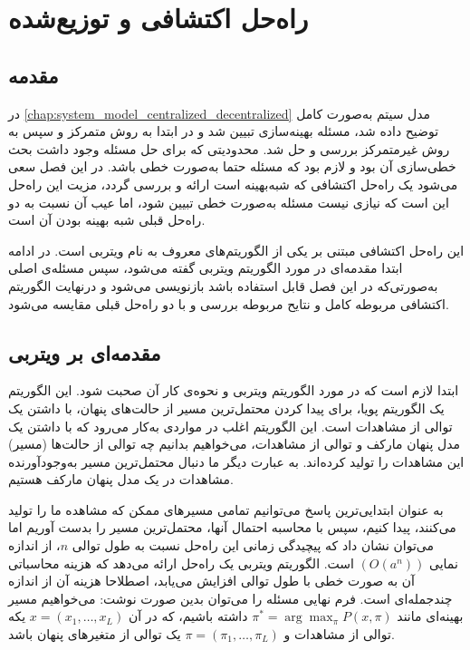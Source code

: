 \chapter{راه‌حل اکتشافی و توزیع‌شده}\label{chap:4-heuristic_distributed}
\thispagestyle{empty}
\section{مقدمه}
	در \cref{chap:system_model_centralized_decentralized} مدل سیتم به‌صورت کامل توضیح داده شد، مسئله بهینه‌سازی تبیین شد و در ابتدا به روش متمرکز و سپس به روش غیرمتمرکز بررسی و حل شد. محدودیتی که برای حل مسئله وجود داشت بحث خطی‌سازی آن بود و لازم بود که مسئله حتما به‌صورت خطی باشد.
	 در این فصل سعی می‌شود یک راه‌حل اکتشافی که شبه‌بهینه است ارائه و بررسی گردد، مزیت این راه‌حل این است که نیازی نیست مسئله به‌صورت خطی تبیین شود، اما عیب آن نسبت به دو راه‌حل قبلی شبه بهینه بودن آن است. 
	 
	 این راه‌حل اکتشافی مبتنی بر یکی از الگوریتم‌های معروف به نام ویتربی است. در ادامه ابتدا مقدمه‌ای در مورد الگوریتم ویتربی گفته می‌شود، سپس مسئله‌ی اصلی به‌صورتی‌که در این فصل قابل استفاده باشد بازنویسی می‌شود و درنهایت الگوریتم اکتشافی مربوطه کامل و نتایح مربوطه بررسی و با دو راه‌حل قبلی مقایسه می‌شود. 
\section{مقدمه‌ای بر ویتربی}
	 ابتدا لازم است که در مورد الگوریتم ویتربی و نحوه‌ی کار آن صحبت شود. این الگوریتم یک الگوریتم پویا، برای پیدا کردن محتمل‌ترین مسیر از حالت‌های پنهان، با داشتن یک توالی از مشاهدات است. این الگوریتم اغلب در مواردی به‌کار می‌رود که با داشتن یک مدل پنهان مارکف و توالی‌ از مشاهدات، می‌خواهیم بدانیم چه توالی‌ از حالت‌ها (مسیر) این مشاهدات را تولید کرده‌اند. به عبارت دیگر ما دنبال محتمل‌ترین مسیر به‌وجودآورنده مشاهدات در یک مدل پنهان مارکف هستیم. 
	 
	 به عنوان ابتدایی‌ترین پاسخ می‌توانیم تمامی مسیرهای ممکن که مشاهده ما را تولید می‌کنند، پیدا کنیم، سپس با محاسبه احتمال آنها، محتمل‌ترین مسیر را بدست آوریم اما می‌توان نشان داد که پیچیدگی زمانی این راه‌حل نسبت به طول توالی $n$، از اندازه نمایی $(O(a^n))$ است. الگوریتم ویتربی یک راه‌حل ارائه می‌دهد که هزینه محاسباتی آن به صورت خطی با طول توالی افزایش می‌یابد، اصطلاحا هزینه آن از اندازه چندجمله‌ای است. فرم نهایی مسئله را می‌توان بدین صورت نوشت: می‌خواهیم مسیر بهینه‌ای مانند $\displaystyle \pi^* = \arg \max_\pi P(x,\pi)$ داشته باشیم، که در آن $x=(x_1, \dots, x_L)$ یکه توالی از مشاهدات و $\pi = (\pi_1, \dots, \pi_L)$ یک توالی از متغیرهای پنهان باشد. 
	 
